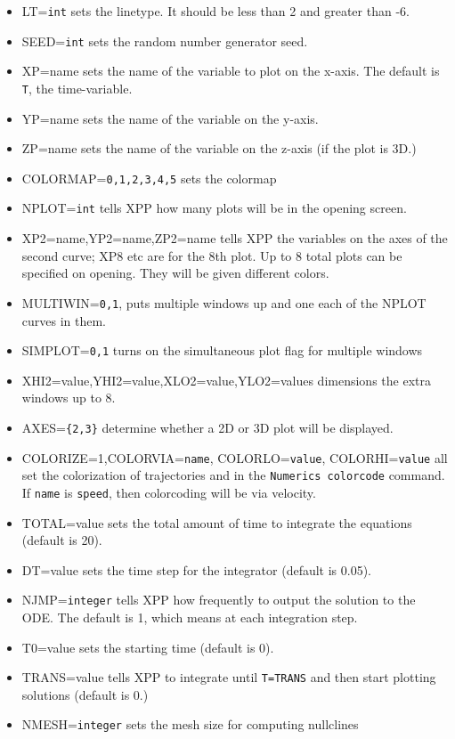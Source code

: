 \begin{itemize}\itemsep -.05in
\item LT={\tt int} sets the linetype. It should be less than 2 and
greater than -6. 
\item SEED={\tt int} sets the random number generator seed. 
 \item XP=name sets the name of the variable to plot on the x-axis.
The default is {\tt T}, the time-variable.
\item YP=name sets the name of the variable on the y-axis.
\item ZP=name sets the name of the variable on the z-axis (if the plot
is 3D.) 
\item COLORMAP={\tt 0,1,2,3,4,5} sets the colormap
\item NPLOT={\tt int} tells XPP how many plots will be in the opening
screen. 
\item XP2=name,YP2=name,ZP2=name tells XPP the variables on the axes
of the second curve; XP8 etc are for the 8th plot. Up to 8 total plots
can be specified on opening. They will be given different colors.  
\item MULTIWIN={\tt 0,1}, puts multiple windows up and one each of the NPLOT curves in them. 
\item SIMPLOT={\tt 0,1} turns on the simultaneous plot flag for multiple windows
\item XHI2=value,YHI2=value,XLO2=value,YLO2=values dimensions the extra windows up to 8. 
\item AXES={\tt \{2,3\}} determine whether a 2D or 3D plot will be
displayed.
\item COLORIZE=1,COLORVIA={\tt name}, COLORLO={\tt value}, COLORHI={\tt value} all set the colorization of trajectories and in the {\tt Numerics colorcode} command. If {\tt name} is {\tt speed}, then colorcoding will be via velocity.
\item TOTAL=value sets the total amount of time to integrate the
equations (default is 20).
\item DT=value sets the time step for the integrator (default is 0.05).
\item NJMP={\tt integer} tells XPP how frequently to output the
solution to the ODE.  The default is 1, which means at each
integration step.
\item T0=value sets the starting time (default is 0). 
\item TRANS=value tells XPP to integrate until {\tt T=TRANS} and then
start plotting solutions (default is 0.)
\item NMESH={\tt integer} sets the mesh size for computing nullclines

\end{itemize}
